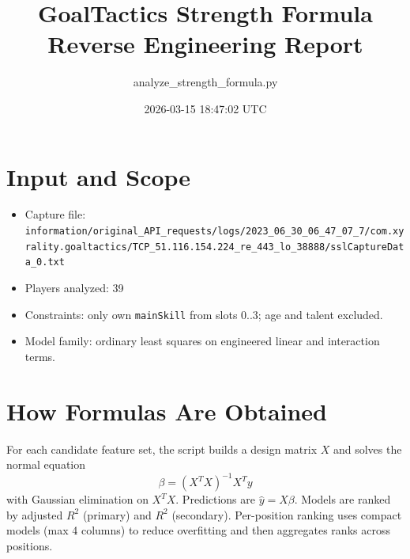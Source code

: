 \documentclass[a4paper,11pt]{article}
\begin{document}
\title{GoalTactics Strength Formula Reverse Engineering Report}
\author{analyze\_strength\_formula.py}
\date{2026-03-15 18:47:02 UTC}
\maketitle
\section*{Input and Scope}
\begin{itemize}
\item Capture file: \texttt{information/original\_API\_requests/logs/2023\_06\_30\_06\_47\_07\_7/com.xyrality.goaltactics/TCP\_51.116.154.224\_re\_443\_lo\_38888/sslCaptureData\_0.txt}
\item Players analyzed: 39
\item Constraints: only own \texttt{mainSkill} from slots 0..3; age and talent excluded.
\item Model family: ordinary least squares on engineered linear and interaction terms.
\end{itemize}
\section*{How Formulas Are Obtained}
For each candidate feature set, the script builds a design matrix $X$ and solves the normal equation
$$\beta = (X^T X)^{-1} X^T y$$
with Gaussian elimination on $X^TX$. Predictions are $\hat{y}=X\beta$. Models are ranked by adjusted $R^2$ (primary) and $R^2$ (secondary).
Per-position ranking uses compact models (max 4 columns) to reduce overfitting and then aggregates ranks across positions.
\end{document}
